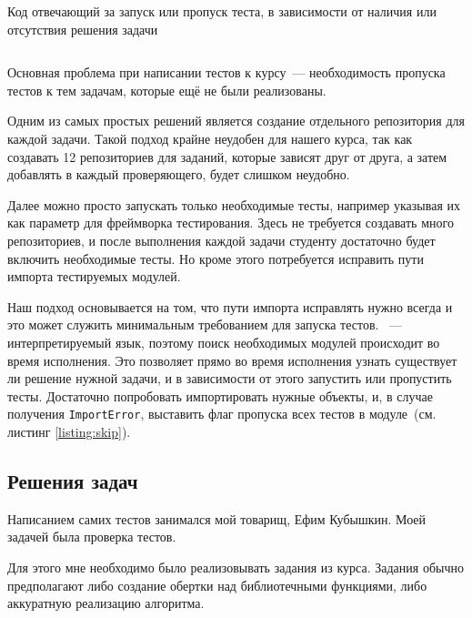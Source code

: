 \begin{listing}[b]
    \caption{Код отвечающий за запуск или пропуск теста, в зависимости от наличия или отсутствия решения задачи}
    \inputminted[linenos, breaklines, frame=single, fontsize = \small]{python3}{figures/minimal_example.py}
    \label{listing:skip}
\end{listing}

Основная проблема при написании тестов к курсу~--- необходимость пропуска тестов к тем задачам, которые ещё не были реализованы.

Одним из самых простых решений является создание отдельного репозитория для каждой задачи.
Такой подход крайне неудобен для нашего курса, так как создавать 12 репозиториев для заданий, которые зависят друг от друга, а затем добавлять в каждый проверяющего, будет слишком неудобно.

Далее можно просто запускать только необходимые тесты, например указывая их как параметр для фреймворка тестирования.
Здесь не требуется создавать много репозиториев, и после выполнения каждой задачи студенту достаточно будет включить необходимые тесты.
Но кроме этого потребуется исправить пути импорта тестируемых модулей.

Наш подход основывается на том, что пути импорта исправлять нужно всегда и это может служить минимальным требованием для запуска тестов.
\python{}~--- интерпретируемый язык, поэтому поиск необходимых модулей происходит во время исполнения.
Это позволяет прямо во время исполнения узнать существует ли решение нужной задачи, и в зависимости от этого запустить или пропустить тесты.
Достаточно попробовать импортировать нужные объекты, и, в случае получения \texttt{ImportError}, выставить флаг пропуска всех тестов в модуле~(см. листинг \ref{listing:skip}).

\subsection{Решения задач}
\label{subsec:slns}


Написанием самих тестов занимался мой товарищ, Ефим Кубышкин.
Моей задачей была проверка тестов.

Для этого мне необходимо было реализовывать задания из курса.
Задания обычно предполагают либо создание обертки над библиотечными функциями, либо аккуратную реализацию алгоритма.


